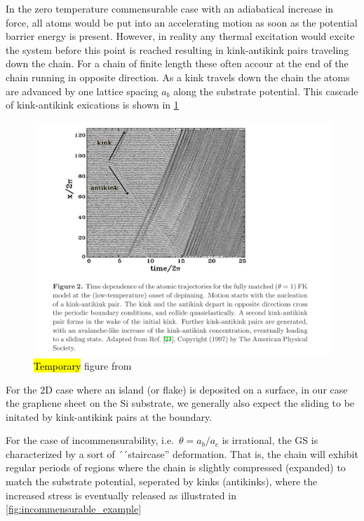 In the zero temperature commensurable case with an adiabatical increase in force, all atoms would be put into an accelerating motion as soon as the potential barrier energy is present. However, in reality any thermal excitation would excite the system before this point is reached resulting in kink-antikink pairs traveling down the chain. For a chain of finite length these often accour at the end of the chain running in opposite direction. As a kink travels down the chain the atoms are advanced by one lattice spacing $a_b$ along the substrate potential. This cascade of kink-antikink exications is shown in \cref{fig:kink_antikink}

\begin{figure}[H]
  \centering
  \includegraphics[width=0.8\linewidth]{figures/theory/kink_antikink.png}
  \caption{\hl{Temporary} figure from \cite{Manini_2016}}
  \label{fig:kink_antikink}
\end{figure}

For the 2D case where an island (or flake) is deposited on a surface, in our case the graphene sheet on the Si substrate, we generally also expect the sliding to be initated by kink-antikink pairs at the boundary. 

For the case of incommensurability, i.e.\ $\theta = a_b/a_c$ is irrational, the
\acrshort{GS} is characterized by a sort of ´´staircase'' deformation. That is, the chain will exhibit regular periods of regions where the chain is slightly compressed
(expanded) to match the substrate potential, seperated by kinks (antikinks),
where the increased stress is eventually released 
as illustrated in \cref{fig:incommensurable_example} 

